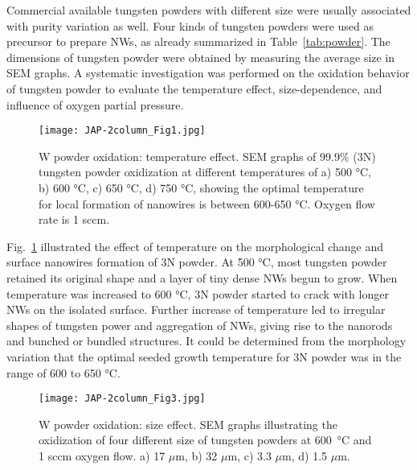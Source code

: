 Commercial available tungsten powders with different size were usually associated with purity variation as well. Four kinds of tungsten powders were used as precursor to prepare  NWs, as already summarized in Table~\ref{tab:powder}. The dimensions of tungsten powder were obtained by measuring the average size in SEM graphs. A systematic investigation was performed on the oxidation behavior of tungsten powder to evaluate the temperature effect, size-dependence, and influence of oxygen partial pressure.

\begin{figure}[htb]
\centering
\texttt{[image: JAP-2column\_Fig1.jpg]}
\caption[W powder oxidation: temperature effect]{W powder oxidation: temperature effect. SEM graphs of 99.9\% (3N) tungsten powder oxidization at different temperatures of a) 500 \si{\degreeCelsius}, b) 600 \si{\degreeCelsius}, c) 650 \si{\degreeCelsius}, d) 750 \si{\degreeCelsius}, showing the optimal temperature for local formation of nanowires is between 600-650 \si{\degreeCelsius}. Oxygen flow rate is 1 sccm.}
\label{fig:pdtemp}
\end{figure}

Fig.~\ref{fig:pdtemp} illustrated the effect of temperature on the morphological change and surface nanowires formation of 3N powder. At 500 \si{\degreeCelsius}, most tungsten powder retained its original shape and a layer of tiny dense NWs begun to grow. When temperature was increased to 600 \si{\degreeCelsius}, 3N powder started to crack with longer NWs on the isolated surface. Further increase of temperature led to irregular shapes of tungsten power and aggregation of NWs, giving rise to the nanorods and bunched or bundled structures. It could be determined from the morphology variation that the optimal seeded growth temperature for 3N powder was in the range of 600 to 650 \si{\degreeCelsius}.
\begin{figure}[htb]
\centering
\texttt{[image: JAP-2column\_Fig3.jpg]}
\caption[W powder oxidation: size effect]{W powder oxidation: size effect. SEM graphs illustrating the oxidization of four different size of tungsten powders at 600~\si{\degreeCelsius} and 1 sccm oxygen flow. a) 17 $\mu$m, b) 32 $\mu$m, c) 3.3 $\mu$m, d) 1.5 $\mu$m.}
\label{fig:pdsize}
\end{figure}

